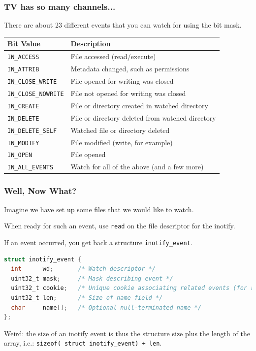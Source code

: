 \begin{frame}
	\frametitle{TV has so many channels...}

	There are about 23 different events that you can watch for using the bit mask.

	\begin{center}
		\begin{tabular}{l|l}
			\textbf{Bit Value}          & \textbf{Description}                             \\ \hline
			\texttt{IN\_ACCESS}         & File accessed (read/execute)                     \\
			\texttt{IN\_ATTRIB}         & Metadata changed, such as permissions            \\
			\texttt{IN\_CLOSE\_WRITE}   & File opened for writing was closed               \\
			\texttt{IN\_CLOSE\_NOWRITE} & File not opened for writing was closed           \\
			\texttt{IN\_CREATE}         & File or directory created in watched directory   \\
			\texttt{IN\_DELETE}         & File or directory deleted from watched directory \\
			\texttt{IN\_DELETE\_SELF}   & Watched file or directory deleted                \\
			\texttt{IN\_MODIFY}         & File modified (write, for example)               \\
			\texttt{IN\_OPEN}           & File opened                                      \\
			\texttt{IN\_ALL\_EVENTS}    & Watch for all of the above (and a few more)
		\end{tabular}
	\end{center}

\end{frame}


\begin{frame}[fragile]
	\frametitle{Well, Now What?}

	Imagine we have set up some files that we would like to watch.

	When ready for such an event, use \texttt{read} on the file descriptor for the inotify.

	If an event occurred, you get back a structure \texttt{inotify\_event}.

	\begin{lstlisting}[language=C]
struct inotify_event {
  int      wd;       /* Watch descriptor */
  uint32_t mask;     /* Mask describing event */
  uint32_t cookie;   /* Unique cookie associating related events (for rename(2))*/  
  uint32_t len;      /* Size of name field */
  char     name[];   /* Optional null-terminated name */
};
\end{lstlisting}

	Weird: the size of an inotify event is thus the structure size plus the length of the array, i.e.: \texttt{sizeof( struct inotify\_event) + len}.

\end{frame}


